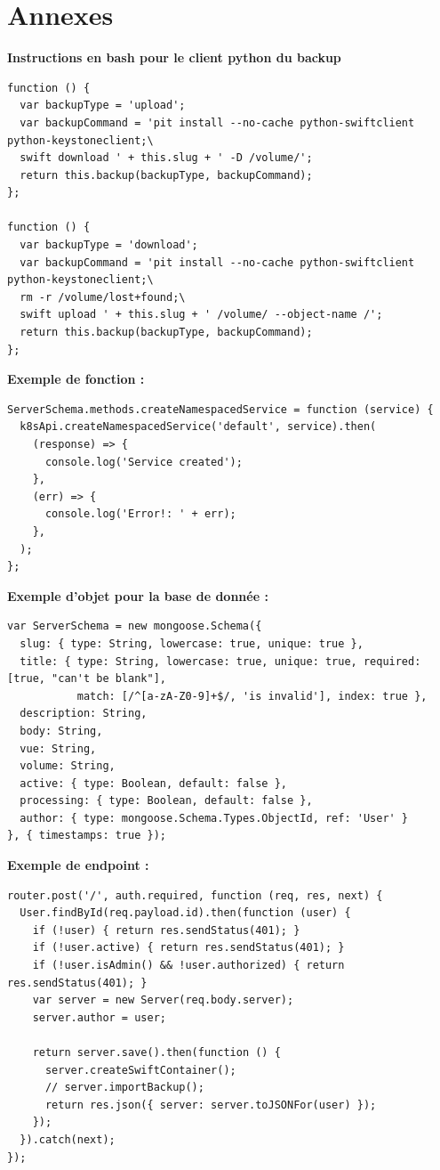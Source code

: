 \documentclass{article}
\begin{document}
\newpage
\section{Annexes}
\textbf{Instructions en bash pour le client python du backup}
\begin{lstlisting}
function () {
  var backupType = 'upload';
  var backupCommand = 'pit install --no-cache python-swiftclient python-keystoneclient;\
  swift download ' + this.slug + ' -D /volume/';
  return this.backup(backupType, backupCommand);
};

function () {
  var backupType = 'download';
  var backupCommand = 'pit install --no-cache python-swiftclient python-keystoneclient;\
  rm -r /volume/lost+found;\
  swift upload ' + this.slug + ' /volume/ --object-name /';
  return this.backup(backupType, backupCommand);
};
\end{lstlisting}
\textbf{Exemple de fonction :}
\begin{lstlisting}
ServerSchema.methods.createNamespacedService = function (service) {
  k8sApi.createNamespacedService('default', service).then(
    (response) => {
      console.log('Service created');
    },
    (err) => {
      console.log('Error!: ' + err);
    },
  );
};
\end{lstlisting}
\textbf{Exemple d'objet pour la base de donnée :}
\begin{lstlisting}
var ServerSchema = new mongoose.Schema({
  slug: { type: String, lowercase: true, unique: true },
  title: { type: String, lowercase: true, unique: true, required: [true, "can't be blank"],
  		   match: [/^[a-zA-Z0-9]+$/, 'is invalid'], index: true },
  description: String,
  body: String,
  vue: String,
  volume: String,
  active: { type: Boolean, default: false },
  processing: { type: Boolean, default: false },
  author: { type: mongoose.Schema.Types.ObjectId, ref: 'User' }
}, { timestamps: true });
\end{lstlisting}
\textbf{Exemple de endpoint :}
\begin{lstlisting}
router.post('/', auth.required, function (req, res, next) {
  User.findById(req.payload.id).then(function (user) {
    if (!user) { return res.sendStatus(401); }
    if (!user.active) { return res.sendStatus(401); }
    if (!user.isAdmin() && !user.authorized) { return res.sendStatus(401); }
    var server = new Server(req.body.server);
    server.author = user;

    return server.save().then(function () {
      server.createSwiftContainer();
      // server.importBackup();
      return res.json({ server: server.toJSONFor(user) });
    });
  }).catch(next);
});
\end{lstlisting}
\end{document}
